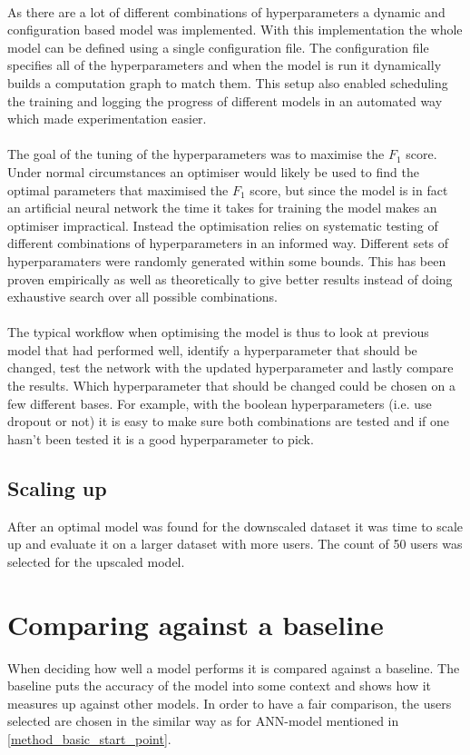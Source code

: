 \\
As there are a lot of different combinations of hyperparameters a dynamic and configuration based model was implemented. With this implementation the whole model can be defined using a single configuration file. The configuration file specifies all of the hyperparameters and when the model is run it dynamically builds a computation graph to match them. This setup also enabled scheduling the training and logging the progress of different models in an automated way which made experimentation easier.
\\\\
The goal of the tuning of the hyperparameters was to maximise the $F_1$ score. Under normal circumstances an optimiser would likely be used to find the optimal parameters that maximised the $F_1$ score, but since the model is in fact an artificial neural network the time it takes for training the model makes an optimiser impractical. Instead the optimisation relies on systematic testing of different combinations of hyperparameters in an informed way. Different sets of hyperparamaters were randomly generated within some bounds. This has been proven empirically as well as theoretically to give better results instead of doing exhaustive search over all possible combinations. \parencite{bergstra2012random}
\\\\
The typical workflow when optimising the model is thus to look at previous model that had performed well, identify a hyperparameter that should be changed, test the network with the updated hyperparameter and lastly compare the results. Which hyperparameter that should be changed could be chosen on a few different bases. For example, with the boolean hyperparameters (i.e. use dropout or not) it is easy to make sure both combinations are tested and if one hasn't been tested it is a good hyperparameter to pick.
\subsection{Scaling up}
After an optimal model was found for the downscaled dataset it was time to scale up and evaluate it on a larger dataset with more users. The count of 50 users was selected for the upscaled model. 
\section{Comparing against a baseline}
When deciding how well a model performs it is compared against a baseline. The baseline puts the accuracy of the model into some context and shows how it measures up against other models. In order to have a fair comparison, the users selected are chosen in the similar way as for ANN-model mentioned in \ref{method_basic_start_point}. 
